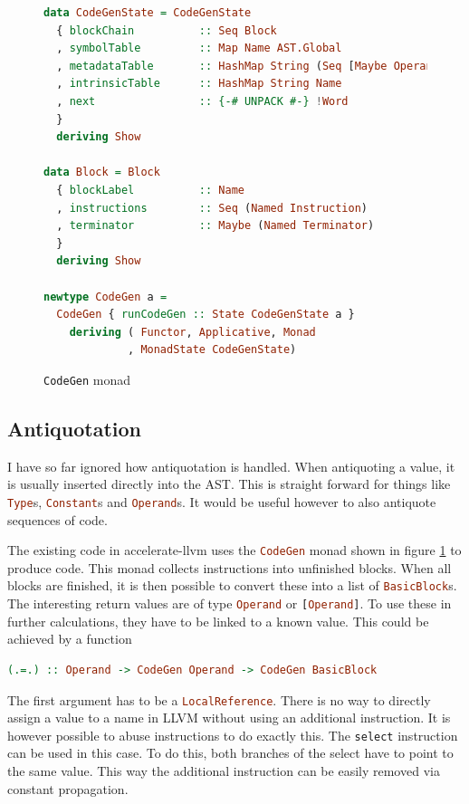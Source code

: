 \documentclass[a4paper,bibliography=totocnumbered,parskip,headsepline]{scrbook}
\begin{document}
\begin{figure}[h]
\begin{lstlisting}[language=haskell]
data CodeGenState = CodeGenState
  { blockChain          :: Seq Block
  , symbolTable         :: Map Name AST.Global
  , metadataTable       :: HashMap String (Seq [Maybe Operand])
  , intrinsicTable      :: HashMap String Name
  , next                :: {-# UNPACK #-} !Word
  }
  deriving Show

data Block = Block
  { blockLabel          :: Name
  , instructions        :: Seq (Named Instruction)
  , terminator          :: Maybe (Named Terminator)
  }
  deriving Show

newtype CodeGen a =
  CodeGen { runCodeGen :: State CodeGenState a }
    deriving ( Functor, Applicative, Monad
             , MonadState CodeGenState)
\end{lstlisting}
\caption{\lstinline!CodeGen! monad}
\label{fig:codegen}
\end{figure}

\subsection{Antiquotation}
I have so far ignored how antiquotation is handled.
When antiquoting a value, it is usually inserted directly into the AST.
This is straight forward for things like \lstinline[language=haskell]!Type!s, \lstinline[language=haskell]!Constant!s and \lstinline[language=haskell]!Operand!s.
It would be useful however to also antiquote sequences of code.

The existing code in accelerate-llvm uses the \lstinline[language=haskell]!CodeGen! monad shown in figure \ref{fig:codegen} to produce code.
This monad collects instructions into unfinished blocks.
When all blocks are finished, it is then possible to convert these into a list of \lstinline[language=haskell]!BasicBlock!s.
The interesting return values are of type \lstinline[language=haskell]!Operand! or \lstinline[language=haskell]![Operand]!.
To use these in further calculations, they have to be linked to a known value.
This could be achieved by a function
\begin{lstlisting}[language=haskell]
(.=.) :: Operand -> CodeGen Operand -> CodeGen BasicBlock
\end{lstlisting}
The first argument has to be a \lstinline[language=haskell]!LocalReference!.
There is no way to directly assign a value to a name in LLVM without using an additional instruction.
It is however possible to abuse instructions to do exactly this.
The \lstinline!select! instruction can be used in this case.
To do this, both branches of the select have to point to the same value.
This way the additional instruction can be easily removed via constant propagation.
\end{document}
